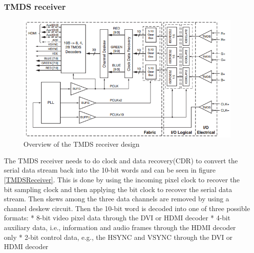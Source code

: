 \subsubsection{TMDS receiver}
\begin{figure}[h!]
    \centering
    \includegraphics[scale= 0.7, angle = 90]{img/TMDSreceiverdesign.png}
    \caption{Overview of the TMDS receiver design}
    \label{fig:TMDSReceiver}
\end{figure}
The TMDS receiver needs to do clock and data recovery(CDR) to convert the serial data stream back into the 10-bit words and can be seen in figure \ref{TMDSReceiver}. This is done by using the incoming pixel clock to recover the bit sampling clock and then applying the bit clock to recover the serial data stream. Then skews among the three data channels are removed by using a channel deskew circuit. Then the 10-bit word is decoded into one of three possible formats:
* 8-bit video pixel data through the DVI or HDMI decoder
* 4-bit auxiliary data, i.e., information and audio frames through the HDMI decoder only
* 2-bit control data, e.g., the HSYNC and VSYNC through the DVI or HDMI decoder
